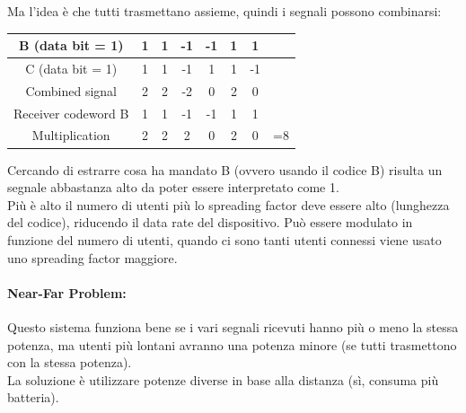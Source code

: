 Ma l'idea è che tutti trasmettano assieme, quindi i segnali possono combinarsi:
\begin{center}
	{
	\renewcommand{\arraystretch}{1.2}
	\begin{tabular}{|c|c|c|c|c|c|c|c|}
		\hline
		B (data bit = 1) & 1 & 1 & -1 & -1 & 1 & 1 &\\ 
		\hline
		C (data bit = 1) & 1 & 1 & -1 & 1 & 1 & -1 &\\ 
		\hline
		Combined signal & 2 & 2 & -2 & 0 & 2 & 0 & \\ 
		\hline
		Receiver codeword B & 1 & 1 & -1 & -1 & 1 & 1 & \\ 
		\hline
		Multiplication & 2 & 2 & 2 & 0 & 2 & 0 & =8 \\ 
		\hline
	\end{tabular}
	}
\end{center}
Cercando di estrarre cosa ha mandato B (ovvero usando il codice B) risulta un segnale abbastanza alto da poter essere interpretato come 1.\\

Più è alto il numero di utenti più lo spreading factor deve essere alto (lunghezza del codice), riducendo il data rate del dispositivo. Può essere modulato in funzione del numero di utenti, quando ci sono tanti utenti connessi viene usato uno spreading factor maggiore.\\

\paragraph{Near-Far Problem:} Questo sistema funziona bene se i vari segnali ricevuti hanno più o meno la stessa potenza, ma utenti più lontani avranno una potenza minore (se tutti trasmettono con la stessa potenza).\\
La soluzione è utilizzare potenze diverse in base alla distanza (sì, consuma più batteria).\\
